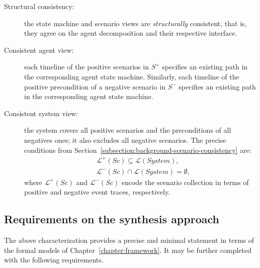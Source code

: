 \begin{description}
\item[Structural consistency:] the state machine and scenario views are \emph{structurally} consistent, that is, they agree on the agent decomposition and their respective interface.

\item[Consistent agent view:] each timeline of the positive scenarios in $S^+$ specifies an existing path in the corresponding agent state machine. Similarly, each timeline of the positive precondition of a negative scenario in $S^-$ specifies an existing path in the corresponding agent state machine. 

\item[Consistent system view:] the system covers all positive scenarios and the preconditions of all negatives ones; it also excludes all negative scenarios. The precise conditions from Section~\ref{subsection:background-scenario-consistency} are:
\begin{align}
&\mathcal{L}^+(Sc) \subseteq \mathcal{L}(System),\\
&\mathcal{L}^-(Sc) \cap \mathcal{L}(System) = \emptyset,
\label{relation:inductive-statement-negative}
\end{align}
where $\mathcal{L}^+(Sc)$ and $\mathcal{L}^-(Sc)$ encode the scenario collection in terms of positive and negative event traces, respectively.

\end{description}


\subsection{Requirements on the synthesis approach\label{subsection:inductive-synthesis-requirements}}

The above characterization provides a precise and minimal statement in terms of the formal models of Chapter~\ref{chapter:framework}. It may be further completed with the following requirements.

